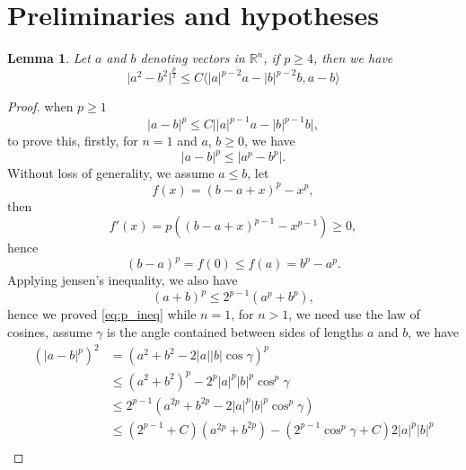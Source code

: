 \documentclass[11pt]{amsart}
\newtheorem{lemma}[theorem]{Lemma}
\theoremstyle{definition}
\numberwithin{equation}{section}
\newcommand*\abs[1]{\lvert#1\rvert}
\newcommand\R{\mathbb{R}}
\begin{document}
\section{Preliminaries and hypotheses}
\begin{lemma}\label{lem:VecIneq}
	Let $a$ and $b$ denoting vectors in $\R^{n}$, if $p \geq 4$, then we have
	\begin{equation}
		\abs{a^2 - b^2}^{\frac{p}{2}}
		\leq C \langle \abs{a}^{p-2}a - \abs{b}^{p-2}b, a-b\rangle
	\end{equation}
\end{lemma}
\begin{proof}
	when $p \geq 1 $
	\begin{equation}\label{eq:p_ineq}
		\abs{a-b}^p \leq C\abs{\abs{a}^{p-1}a - \abs{b}^{p-1}b},
	\end{equation}
	to prove this, firstly, for $n = 1$ and $a$, $b \geq 0$, we have
	\begin{equation}
		\abs{a-b}^p \leq \abs{a^p - b^p}.
	\end{equation}
	Without loss of generality, we assume $a \leq b$, let
	\begin{equation}
		f(x) = (b-a+x)^p - x^p,
	\end{equation}
	then
	\begin{equation}
		f'(x) = p\left((b-a+x)^{p-1} - x^{p-1}\right) \geq 0,
	\end{equation}
	hence
	\begin{equation}
		\left(b-a\right)^p = f(0) \leq f(a) = b^p - a^p.
	\end{equation}
	Applying jensen's inequality, we also have
	\begin{equation}
		\left(a+b\right)^p \leq 2^{p-1}\left(a^p + b^p\right),
	\end{equation}
	hence we proved \cref{eq:p_ineq} while $n = 1$, for $n > 1$, we need use
	the law of cosines, assume $\gamma$ is the angle contained between sides
	of lengths $a$ and $b$, we have
	\begin{equation}
		\begin{split}
			\left(\abs{a-b}^p\right)^2
			&= \left(a^2 + b^2 - 2 \abs{a}\abs{b}\cos{\gamma}\right)^p\\
			&\leq \left(a^2+b^2\right)^p - 2^p\abs{a}^p\abs{b}^p\cos^p{\gamma}\\
			&\leq 2^{p-1}\left(a^{2p} + b^{2p} - 2\abs{a}^p\abs{b}^p\cos^p{\gamma}\right)\\
			&\leq \left(2^{p-1}+C\right)\left(a^{2p} + b^{2p}\right)
			- \left(2^{p-1}\cos^p{\gamma}+C\right)2\abs{a}^p\abs{b}^p\\

\end{split}
\end{equation}
\end{proof}
\end{document}

